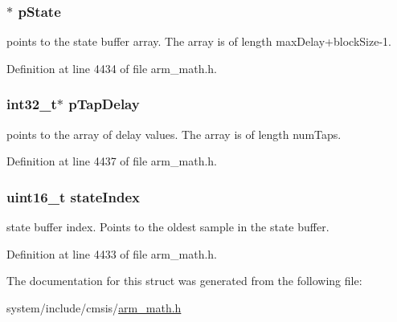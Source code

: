 \subsubsection[{\texorpdfstring{p\+State}{pState}}]{$\ast$ p\+State}\hypertarget{structarm__fir__sparse__instance__f32_a335c87e6fdc4b96601d95a5de8b9c463}{}\label{structarm__fir__sparse__instance__f32_a335c87e6fdc4b96601d95a5de8b9c463}
points to the state buffer array. The array is of length max\+Delay+block\+Size-\/1. 

Definition at line 4434 of file arm\+\_\+math.\+h.

\subsubsection[{\texorpdfstring{p\+Tap\+Delay}{pTapDelay}}]{\setlength{\rightskip}{0pt plus 5cm}int32\+\_\+t$\ast$ p\+Tap\+Delay}\hypertarget{structarm__fir__sparse__instance__f32_adec00b3793ab4f08edfeb4ea6a9eb6e6}{}\label{structarm__fir__sparse__instance__f32_adec00b3793ab4f08edfeb4ea6a9eb6e6}
points to the array of delay values. The array is of length num\+Taps. 

Definition at line 4437 of file arm\+\_\+math.\+h.

\subsubsection[{\texorpdfstring{state\+Index}{stateIndex}}]{\setlength{\rightskip}{0pt plus 5cm}uint16\+\_\+t state\+Index}\hypertarget{structarm__fir__sparse__instance__f32_a566a0cb53437e48b9a3bf18e5b03d8aa}{}\label{structarm__fir__sparse__instance__f32_a566a0cb53437e48b9a3bf18e5b03d8aa}
state buffer index. Points to the oldest sample in the state buffer. 

Definition at line 4433 of file arm\+\_\+math.\+h.



The documentation for this struct was generated from the following file\+:\begin{DoxyCompactItemize}
\item 
system/include/cmsis/\hyperlink{arm__math_8h}{arm\+\_\+math.\+h}\end{DoxyCompactItemize}
